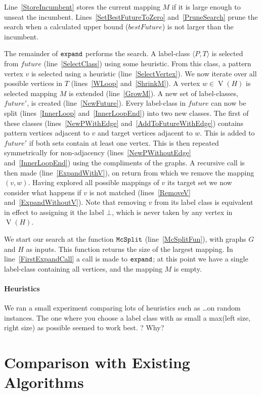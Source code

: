 \documentclass[letterpaper]{article}
\newcommand{\AlgVar}[1]{\mathit{#1}}
\newcommand{\lineref}[1]{line~\ref{#1}}
\newcommand{\twolinesref}[2]{lines~\ref{#1} and~\ref{#2}}
\newcommand{\Lineref}[1]{Line~\ref{#1}}
\newcommand{\Twolinesref}[2]{Lines~\ref{#1} and~\ref{#2}}
\DeclareMathOperator{\V}{V}
\begin{document}
\Lineref{StoreIncumbent} stores the current mapping $M$ if it is large enough
to unseat the incumbent.  \Twolinesref{SetBestFutureToZero}{PruneSearch} prune
the search when a calculated upper bound ($\AlgVar{bestFuture}$) is not larger
than the incumbent.

The remainder of $\FuncSty{expand}$ performs the search.  A label-class
$\langle P, T \rangle$ is selected from $\AlgVar{future}$
(\lineref{SelectClass}) using some heuristic.  From this class, a pattern
vertex $v$ is selected using a heuristic (\lineref{SelectVertex}). We now
iterate over all possible vertices in $T$ (\twolinesref{WLoop}{ShrinkM}). A
vertex $w \in \V(H)$ is selected mapping $M$ is extended (\lineref{GrowM}). A
new set of label-classes, $\AlgVar{future'}$, is created (\lineref{NewFuture}).
Every label-class in $\AlgVar{future}$ can now be split
(\twolinesref{InnerLoop}{InnerLoopEnd}) into two new classes. The first of
these classes (\twolinesref{NewPWithEdge}{AddToFutureWithEdge}) contains
pattern vertices adjacent to $v$ and target vertices adjacent to $w$.  This is
added to $\AlgVar{future'}$ if both sets contain at least one vertex.  This is
then repeated symmetrically for non-adjacency
(\twolinesref{NewPWithoutEdge}{InnerLoopEnd}) using the compliments of the
graphs.  A recursive call is then made (\lineref{ExpandWithV}), on return from
which we remove the mapping $(v,w)$.  Having explored all possible mappings of
$v$ its target set we now consider what happens if $v$ is not matched
(\twolinesref{RemoveV}{ExpandWithoutV}). Note that removing $v$ from its label
class is equivalent in effect to assigning it the label $\bot$, which is never
taken by any vertex in $\V(H)$.

We start our search at the function $\FuncSty{McSplit}$ (\lineref{McSplitFun}),
with graphs $G$ and $H$ as inputs.  This function returns the size of the
largest mapping.  In \lineref{FirstExpandCall} a call is made to
$\FuncSty{expand}$; at this point we have a single label-class containing all
vertices, and the mapping $M$ is empty.

\paragraph{Heuristics} We ran a small experiment comparing lots of heuristics
such as \dots on random instances. The one where you choose a label class with
as small a max(left size, right size) as possible seemed to work best. ? Why?

\section{Comparison with Existing Algorithms}\label{sec:comparison}
\end{document}
